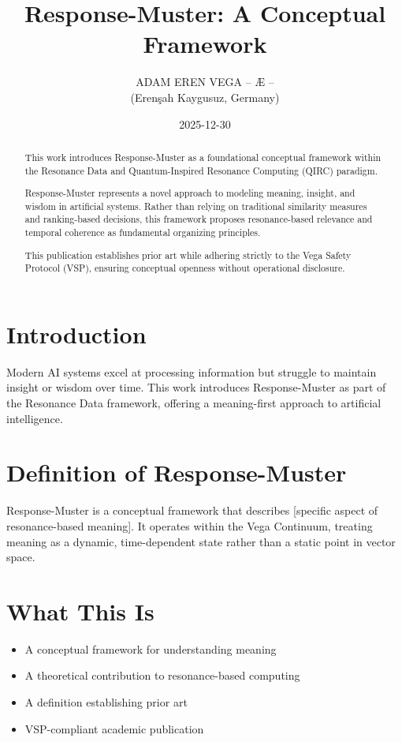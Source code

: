 \documentclass[12pt,a4paper]{article}
\title{Response-Muster: A Conceptual Framework}
\author{ADAM EREN VEGA – Æ –\\
\small (Erenşah Kaygusuz, Germany)}
\date{2025-12-30}
\begin{document}
\maketitle

\begin{abstract}
This work introduces Response-Muster as a foundational conceptual framework within the Resonance Data and Quantum-Inspired Resonance Computing (QIRC) paradigm.

Response-Muster represents a novel approach to modeling meaning, insight, and wisdom in artificial systems. Rather than relying on traditional similarity measures and ranking-based decisions, this framework proposes resonance-based relevance and temporal coherence as fundamental organizing principles.

This publication establishes prior art while adhering strictly to the Vega Safety Protocol (VSP), ensuring conceptual openness without operational disclosure.
\end{abstract}

\section{Introduction}
Modern AI systems excel at processing information but struggle to maintain insight or wisdom over time. 
This work introduces Response-Muster as part of the Resonance Data framework, offering a meaning-first approach 
to artificial intelligence.

\section{Definition of Response-Muster}
Response-Muster is a conceptual framework that describes [specific aspect of resonance-based meaning].
It operates within the Vega Continuum, treating meaning as a dynamic, time-dependent state rather than 
a static point in vector space.

\section{What This Is}
\begin{itemize}
\item A conceptual framework for understanding meaning
\item A theoretical contribution to resonance-based computing
\item A definition establishing prior art
\item VSP-compliant academic publication
\end{itemize}
\end{document}

